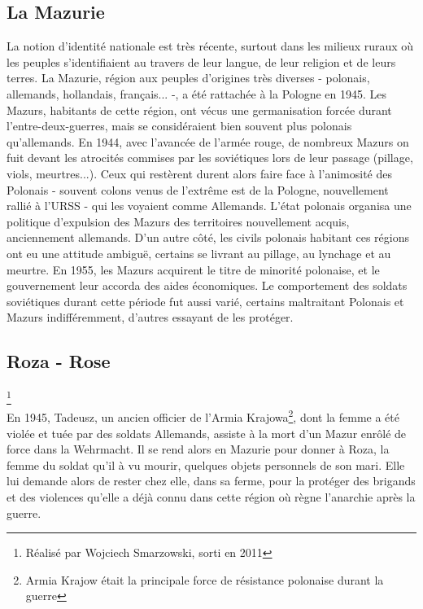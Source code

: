 \documentclass[12pt]{amsart}
\begin{document}
\begin{multicols}{2}
\section{La Mazurie}
La notion d'identité nationale est très récente, surtout dans les milieux ruraux où les peuples s'identifiaient au travers de leur langue, de leur religion et de leurs terres. La Mazurie, région aux peuples d'origines très diverses - polonais, allemands, hollandais, français... -, a été rattachée à la Pologne en 1945. Les Mazurs, habitants de cette région, ont vécus une germanisation forcée durant l'entre-deux-guerres, mais se considéraient bien souvent plus polonais qu'allemands. En 1944, avec l'avancée de l'armée rouge, de nombreux Mazurs on fuit devant les atrocités commises par les soviétiques lors de leur passage (pillage, viols, meurtres...). Ceux qui restèrent durent alors faire face à l'animosité des Polonais - souvent colons venus de l'extrême est de la Pologne, nouvellement rallié à l'URSS - qui les voyaient comme Allemands. L'état polonais organisa une politique d'expulsion des Mazurs des territoires nouvellement acquis, anciennement allemands. D'un autre côté, les civils polonais habitant ces régions ont eu une attitude ambiguë, certains se livrant au pillage, au lynchage et au meurtre. En 1955, les Mazurs acquirent le titre de minorité polonaise, et le gouvernement leur accorda des aides économiques. Le comportement des soldats soviétiques durant cette période fut aussi varié, certains maltraitant Polonais et Mazurs indifféremment, d'autres essayant de les protéger.\\
\subsection*{Roza - Rose}\footnote{Réalisé par Wojciech Smarzowski, sorti en 2011}\\

En 1945, Tadeusz, un ancien officier de l'Armia Krajowa\footnote{Armia Krajow était la principale force de résistance polonaise durant la guerre}, dont la femme a été violée et tuée par des soldats Allemands, assiste à la mort d'un Mazur enrôlé de force dans la Wehrmacht. Il se rend alors en Mazurie pour donner à Roza, la femme du soldat qu'il à vu mourir, quelques objets personnels de son mari. Elle lui demande alors de rester chez elle, dans sa ferme, pour la protéger des brigands et des violences qu'elle a déjà connu dans cette région où règne l'anarchie après la guerre.\\


\end{multicols}
\end{document}
